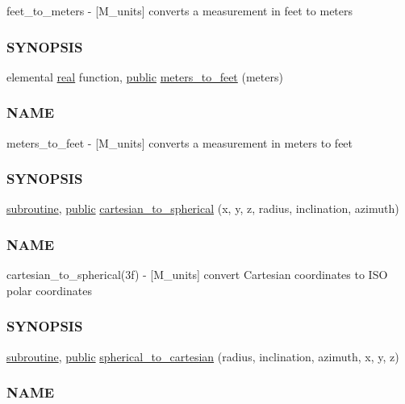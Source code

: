 \begin{DoxyCompactItemize}
\begin{DoxyCompactList}
feet\+\_\+to\+\_\+meters -\/ \mbox{[}M\+\_\+units\mbox{]} converts a measurement in feet to meters \subsubsection*{S\+Y\+N\+O\+P\+S\+IS}\end{DoxyCompactList}\item 
elemental \hyperlink{read__watch_83_8txt_abdb62bde002f38ef75f810d3a905a823}{real} function, \hyperlink{M__stopwatch_83_8txt_a2f74811300c361e53b430611a7d1769f}{public} \hyperlink{namespacem__units_a0ac5ab49814761420953eb6b859c80fd}{meters\+\_\+to\+\_\+feet} (meters)
\begin{DoxyCompactList}\small\item\em \subsubsection*{N\+A\+ME}

meters\+\_\+to\+\_\+feet -\/ \mbox{[}M\+\_\+units\mbox{]} converts a measurement in meters to feet \subsubsection*{S\+Y\+N\+O\+P\+S\+IS}\end{DoxyCompactList}\item 
\hyperlink{M__stopwatch_83_8txt_acfbcff50169d691ff02d4a123ed70482}{subroutine}, \hyperlink{M__stopwatch_83_8txt_a2f74811300c361e53b430611a7d1769f}{public} \hyperlink{namespacem__units_a3a1fe55d63ec4ac38f3d00005f9ebac5}{cartesian\+\_\+to\+\_\+spherical} (x, y, z, radius, inclination, azimuth)
\begin{DoxyCompactList}\small\item\em \subsubsection*{N\+A\+ME}

cartesian\+\_\+to\+\_\+spherical(3f) -\/ \mbox{[}M\+\_\+units\mbox{]} convert Cartesian coordinates to I\+SO polar coordinates \subsubsection*{S\+Y\+N\+O\+P\+S\+IS}\end{DoxyCompactList}\item 
\hyperlink{M__stopwatch_83_8txt_acfbcff50169d691ff02d4a123ed70482}{subroutine}, \hyperlink{M__stopwatch_83_8txt_a2f74811300c361e53b430611a7d1769f}{public} \hyperlink{namespacem__units_ae79705192f0982ec3a091c4df260dfcd}{spherical\+\_\+to\+\_\+cartesian} (radius, inclination, azimuth, x, y, z)
\begin{DoxyCompactList}\small\item\em \subsubsection*{N\+A\+ME}


\end{DoxyCompactList}
\end{DoxyCompactItemize}

